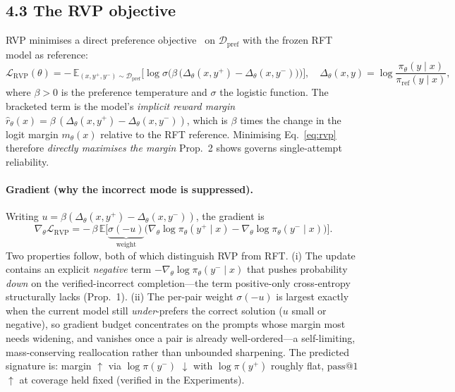 \subsection*{4.3 The RVP objective}

RVP minimises a direct preference objective~\cite{rafailov2023dpo} on
$\mathcal{D}_{\text{pref}}$ with the frozen RFT model as reference:
\begin{equation}
\mathcal{L}_{\text{RVP}}(\theta)=
-\,\mathbb{E}_{(x,y^{+},y^{-})\sim\mathcal{D}_{\text{pref}}}
\Big[\log\sigma\!\Big(\beta\,\big(\Delta_\theta(x,y^{+})-\Delta_\theta(x,y^{-})\big)\Big)\Big],
\quad
\Delta_\theta(x,y)=\log\frac{\pi_\theta(y\mid x)}{\pi_{\text{ref}}(y\mid x)} ,
\label{eq:rvp}
\end{equation}
where $\beta>0$ is the preference temperature and $\sigma$ the logistic function.
The bracketed term is the model's \emph{implicit reward margin}
$\hat r_\theta(x)=\beta\,(\Delta_\theta(x,y^{+})-\Delta_\theta(x,y^{-}))$, which is
$\beta$ times the change in the logit margin $m_\theta(x)$ relative to the RFT
reference. Minimising Eq.~\eqref{eq:rvp} therefore \emph{directly maximises the
margin} Prop.~2 shows governs single-attempt reliability.

\paragraph{Gradient (why the incorrect mode is suppressed).}
Writing $u=\beta(\Delta_\theta(x,y^{+})-\Delta_\theta(x,y^{-}))$, the gradient is
\begin{equation}
\nabla_\theta\mathcal{L}_{\text{RVP}}
=-\,\beta\,\mathbb{E}\Big[\underbrace{\sigma(-u)}_{\text{weight}}
\big(\nabla_\theta\log\pi_\theta(y^{+}\!\mid x)
-\nabla_\theta\log\pi_\theta(y^{-}\!\mid x)\big)\Big].
\label{eq:grad}
\end{equation}
Two properties follow, both of which distinguish RVP from RFT. (i) The update
contains an explicit \emph{negative} term $-\nabla_\theta\log\pi_\theta(y^{-}\mid x)$
that pushes probability \emph{down} on the verified-incorrect completion---the term
positive-only cross-entropy structurally lacks (Prop.~1). (ii) The per-pair weight
$\sigma(-u)$ is largest exactly when the current model still \emph{under}-prefers
the correct solution ($u$ small or negative), so gradient budget concentrates on
the prompts whose margin most needs widening, and vanishes once a pair is already
well-ordered---a self-limiting, mass-conserving reallocation rather than unbounded
sharpening. The predicted signature is: margin $\uparrow$ via $\log\pi(y^{-})$
$\downarrow$ with $\log\pi(y^{+})$ roughly flat, $\text{pass}@1$ $\uparrow$ at
coverage held fixed (verified in the Experiments).

